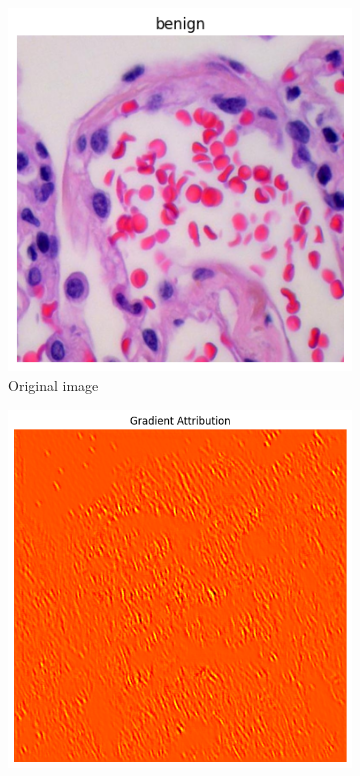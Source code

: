 \documentclass[10pt,twocolumn]{article}
\begin{document}
\begin{figure}[h]
\centering
\begin{subfigure}{0.32\columnwidth}
\includegraphics[width=\linewidth]{imgs/normal_image.png}
\caption{Original image}
\end{subfigure}
\hfill
\begin{subfigure}{0.32\columnwidth}
\includegraphics[width=\linewidth]{imgs/cnn_bp.png}

\end{subfigure}
\end{figure}
\end{document}
